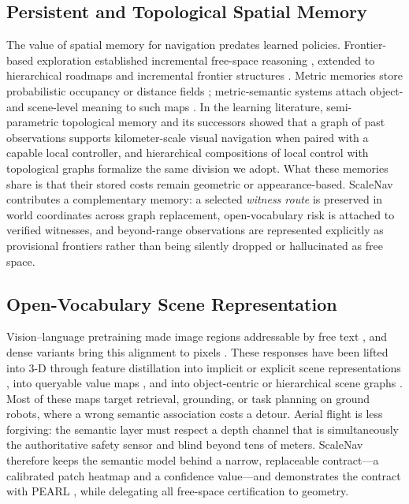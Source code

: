 \documentclass[letterpaper,10pt,conference]{ieeeconf}
\begin{document}
\subsection{Persistent and Topological Spatial Memory}
The value of spatial memory for navigation predates learned policies.
Frontier-based exploration established incremental free-space reasoning
\cite{yamauchi}, extended to hierarchical roadmaps and incremental frontier
structures \cite{fuel,tare,epic}.  Metric memories store probabilistic
occupancy \cite{octomap} or distance fields \cite{voxblox}; metric-semantic
systems attach object- and scene-level meaning to such maps
\cite{kimera,hydra}.  In the learning literature, semi-parametric topological
memory \cite{sptm} and its successors \cite{ving,viking,vint,nomad} showed
that a graph of past observations supports kilometer-scale visual navigation
when paired with a capable local controller, and hierarchical compositions of
local control with topological graphs \cite{meng2020} formalize the same
division we adopt.  What these memories share is that their stored costs
remain geometric or appearance-based.  ScaleNav contributes a complementary
memory: a selected \emph{witness route} is preserved in world coordinates
across graph replacement, open-vocabulary risk is attached to verified
witnesses, and beyond-range observations are represented explicitly as
provisional frontiers rather than being silently dropped or hallucinated as
free space.

\subsection{Open-Vocabulary Scene Representation}
Vision--language pretraining made image regions addressable by free text
\cite{clip}, and dense variants bring this alignment to pixels
\cite{lseg,openseg,pearl}.  These responses have been lifted into 3-D through
feature distillation into implicit or explicit scene representations
\cite{lerf,clipfields,conceptfusion,openscene}, into queryable value maps
\cite{vlmaps}, and into object-centric or hierarchical scene graphs
\cite{conceptgraphs,hovsg}.  Most of these maps target retrieval, grounding,
or task planning on ground robots, where a wrong semantic association costs a
detour.  Aerial flight is less forgiving: the semantic layer must respect a
depth channel that is simultaneously the authoritative safety sensor and
blind beyond tens of meters.  ScaleNav therefore keeps the semantic model
behind a narrow, replaceable contract---a calibrated patch heatmap and a
confidence value---and demonstrates the contract with PEARL \cite{pearl},
while delegating all free-space certification to geometry.
\end{document}
